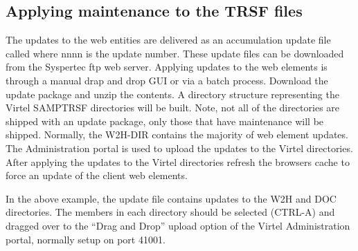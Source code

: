 \documentclass[letterpaper,10pt,english]{sphinxmanual}
\begin{document}
\begin{sphinxVerbatim}[commandchars=\\\{\}]
       
 
      
\end{sphinxVerbatim}

\ignorespaces 

\subsection{Applying maintenance to the TRSF files}
\label{\detokenize{audit_operations_ and_performance:applying-maintenance-to-the-trsf-files}}\label{\detokenize{audit_operations_ and_performance:index-45}}
The updates to the web entities are delivered as an accumulation update file called  where nnnn is the update number. These update files can be downloaded from the Syspertec ftp web server. Applying updates to the web elements is through a manual drap and drop GUI or via a batch process. Download the update package and unzip the contents. A directory structure representing the Virtel SAMPTRSF directories will be built. Note, not all of the directories are shipped with an update package, only those that have maintenance will be shipped. Normally, the W2H-DIR contains the majority of web element updates. The Administration portal is used to upload the updates to the Virtel directories. After applying the updates to the Virtel directories refresh the browsers cache to force an update of the client web elements.



In the above example, the update file contains updates to the W2H and DOC directories. The members in each directory should be selected (CTRL-A) and dragged over to the “Drag and Drop” upload option of the Virtel Administration portal, normally setup on port 41001.
\end{document}
